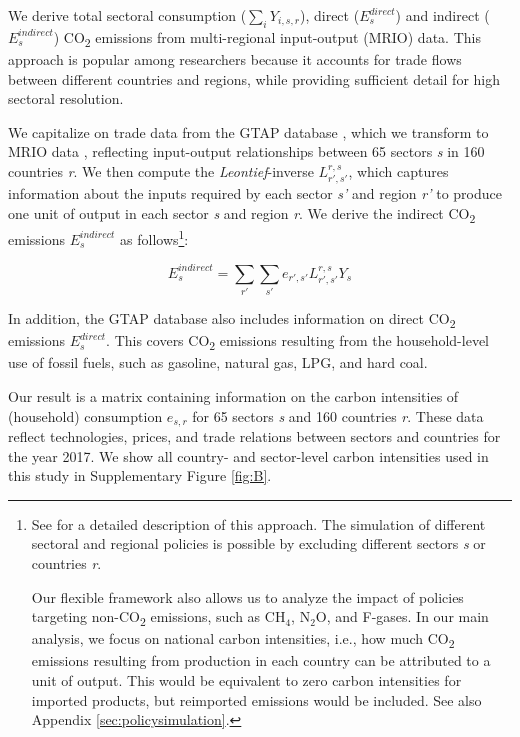 \documentclass[12pt, a4paper]{article}
\begin{document}
We derive total sectoral consumption ($\sum_{i} Y_{i,s,r}$), direct ($E_{s}^{direct}$) and indirect ($E_{s}^{indirect}$) CO\textsubscript{2} emissions from  multi-regional input-output (MRIO) data. This approach is popular among researchers because it accounts for trade flows between different countries and regions, while providing sufficient detail for high sectoral resolution. 

We capitalize on trade data from the GTAP database \autocite[Version 11B, ][]{Aguiar.2022}, which we transform to MRIO data \autocite{Peters.2011}, reflecting input-output relationships between 65 sectors \textit{s} in 160 countries \textit{r}. We then compute the \textit{Leontief}-inverse $L_{r',s'}^{r,s}$, which captures information about the inputs required by each sector \textit{s'} and region \textit{r'} to produce one unit of output in each sector \textit{s} and region \textit{r}. We derive the indirect CO\textsubscript{2} emissions $E_{s}^{indirect}$ as follows\footnote{See \textcite{Missbach.2024, Steckel.2021b,Feindt.2021,VogtSchilb.2019} for a detailed description of this approach. The simulation of different sectoral and regional policies is possible by excluding different sectors \textit{s} or countries \textit{r}. 

Our flexible framework also allows us to analyze the impact of policies targeting non-CO\textsubscript{2} emissions, such as CH$_{4}$, N$_{2}$O, and F-gases. In our main analysis, we focus on national carbon intensities, i.e., how much CO\textsubscript{2} emissions resulting from production in each country can be attributed to a unit of output. This would be equivalent to zero carbon intensities for imported products, but reimported emissions would be included. See also Appendix \ref{sec:policysimulation}.}:

\begin{equation}
    E_{s}^{indirect} = \sum_{r'} \sum_{s'} e_{r',s'} L_{r',s'}^{r,s} Y_{s}
\end{equation}

In addition, the GTAP database also includes information on direct CO\textsubscript{2} emissions $E_{s}^{direct}$. This covers CO\textsubscript{2} emissions resulting from the household-level use of fossil fuels, such as gasoline, natural gas, LPG, and hard coal.

Our result is a matrix containing information on the carbon intensities of (household) consumption $e_{s,r}$ for 65 sectors \textit{s} and 160 countries \textit{r}. These data reflect technologies, prices, and trade relations between sectors and countries for the year 2017. We show all country- and sector-level carbon intensities used in this study in Supplementary Figure \ref{fig:B}.
\end{document}
